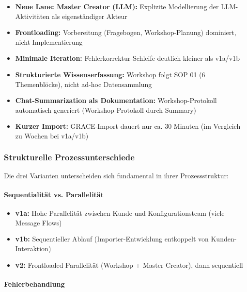 \begin{itemize}
    \item \textbf{Neue Lane: Master Creator (LLM):} Explizite Modellierung der LLM-Aktivitäten als eigenständiger Akteur

    \item \textbf{Frontloading:} Vorbereitung (Fragebogen, Workshop-Planung) dominiert, nicht Implementierung

    \item \textbf{Minimale Iteration:} Fehlerkorrektur-Schleife deutlich kleiner als v1a/v1b

    \item \textbf{Strukturierte Wissenserfassung:} Workshop folgt SOP 01 (6 Themenblöcke), nicht ad-hoc Datensammlung

    \item \textbf{Chat-Summarization als Dokumentation:} Workshop-Protokoll automatisch generiert (\glqq Workshop-Protokoll durch Summary\grqq{})

    \item \textbf{Kurzer Import:} GRACE-Import dauert nur ca. 30 Minuten (im Vergleich zu Wochen bei v1a/v1b)
\end{itemize}

\subsubsection{Strukturelle Prozessunterschiede}

Die drei Varianten unterscheiden sich fundamental in ihrer Prozessstruktur:

\paragraph{Sequentialität vs. Parallelität}

\begin{itemize}
    \item \textbf{v1a:} Hohe Parallelität zwischen Kunde und Konfigurationsteam (viele Message Flows)
    \item \textbf{v1b:} Sequentieller Ablauf (Importer-Entwicklung entkoppelt von Kunden-Interaktion)
    \item \textbf{v2:} Frontloaded Parallelität (Workshop + Master Creator), dann sequentiell
\end{itemize}

\paragraph{Fehlerbehandlung}


